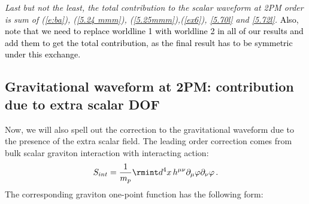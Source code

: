 \textit{Last but not the least, the total contribution to the scalar waveform at 2PM order is sum of (\ref{e:ba}), (\ref{5.24 mmm}), (\ref{5.25mmm}),(\ref{ex6}), \eqref{5.70l} and \eqref{5.72l}.} \textcolor{black}{Also, note that we need to replace worldline 1 with worldline 2 in all of our results and add them to get the total contribution, as the final result has to be symmetric under this exchange. }
\subsection{Gravitational waveform at 2PM: contribution due to extra scalar DOF}
Now, we will also spell out the correction to the gravitational waveform due to the presence of the extra scalar field. The leading order correction comes from bulk scalar graviton interaction with interacting action:
\begin{align}
    S_{int}=\frac{1}{m_p}\rmint d^4x \,h^{\mu\nu}\partial_{\mu}\varphi\partial_{\nu}\varphi\,.
\end{align}
The corresponding graviton one-point function has the following form:

